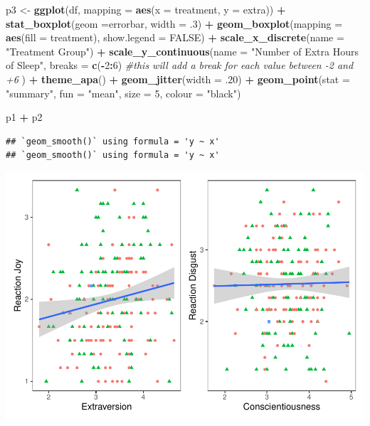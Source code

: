 \documentclass[
]{book}
\newenvironment{Shaded}{\begin{snugshade}}{\end{snugshade}}
\newcommand{\AttributeTok}[1]{\textcolor[rgb]{0.13,0.29,0.53}{#1}}
\newcommand{\CommentTok}[1]{\textcolor[rgb]{0.56,0.35,0.01}{\textit{#1}}}
\newcommand{\ConstantTok}[1]{\textcolor[rgb]{0.56,0.35,0.01}{#1}}
\newcommand{\DecValTok}[1]{\textcolor[rgb]{0.00,0.00,0.81}{#1}}
\newcommand{\FunctionTok}[1]{\textcolor[rgb]{0.13,0.29,0.53}{\textbf{#1}}}
\newcommand{\NormalTok}[1]{#1}
\newcommand{\OtherTok}[1]{\textcolor[rgb]{0.56,0.35,0.01}{#1}}
\newcommand{\SpecialCharTok}[1]{\textcolor[rgb]{0.81,0.36,0.00}{\textbf{#1}}}
\newcommand{\StringTok}[1]{\textcolor[rgb]{0.31,0.60,0.02}{#1}}
\begin{document}
\begin{Shaded}
\begin{Highlighting}[]
\NormalTok{p3 }\OtherTok{\textless{}{-}} \FunctionTok{ggplot}\NormalTok{(df, }\AttributeTok{mapping =} \FunctionTok{aes}\NormalTok{(}\AttributeTok{x =}\NormalTok{ treatment, }\AttributeTok{y =}\NormalTok{ extra)) }\SpecialCharTok{+} 
  \FunctionTok{stat\_boxplot}\NormalTok{(}\AttributeTok{geom =}\StringTok{\textquotesingle{}errorbar\textquotesingle{}}\NormalTok{, }\AttributeTok{width =}\NormalTok{ .}\DecValTok{3}\NormalTok{) }\SpecialCharTok{+}
  \FunctionTok{geom\_boxplot}\NormalTok{(}\AttributeTok{mapping =} \FunctionTok{aes}\NormalTok{(}\AttributeTok{fill =}\NormalTok{ treatment), }\AttributeTok{show.legend =} \ConstantTok{FALSE}\NormalTok{) }\SpecialCharTok{+} 
  \FunctionTok{scale\_x\_discrete}\NormalTok{(}\AttributeTok{name =} \StringTok{"Treatment Group"}\NormalTok{) }\SpecialCharTok{+} 
  \FunctionTok{scale\_y\_continuous}\NormalTok{(}\AttributeTok{name =} \StringTok{"Number of Extra Hours of Sleep"}\NormalTok{, }
                     \AttributeTok{breaks =} \FunctionTok{c}\NormalTok{(}\SpecialCharTok{{-}}\DecValTok{2}\SpecialCharTok{:}\DecValTok{6}\NormalTok{) }\CommentTok{\#this will add a break for each value between {-}2 and +6}
\NormalTok{                     ) }\SpecialCharTok{+}
  \FunctionTok{theme\_apa}\NormalTok{() }\SpecialCharTok{+}
  \FunctionTok{geom\_jitter}\NormalTok{(}\AttributeTok{width =}\NormalTok{ .}\DecValTok{20}\NormalTok{) }\SpecialCharTok{+}
  \FunctionTok{geom\_point}\NormalTok{(}\AttributeTok{stat =} \StringTok{"summary"}\NormalTok{, }\AttributeTok{fun =} \StringTok{"mean"}\NormalTok{, }\AttributeTok{size =} \DecValTok{5}\NormalTok{, }\AttributeTok{colour =} \StringTok{"black"}\NormalTok{)}


\NormalTok{p1 }\SpecialCharTok{+}\NormalTok{ p2}
\end{Highlighting}
\end{Shaded}

\begin{verbatim}
## `geom_smooth()` using formula = 'y ~ x'
## `geom_smooth()` using formula = 'y ~ x'
\end{verbatim}

\includegraphics{rintro_demo_files/figure-latex/unnamed-chunk-320-1.pdf}
\end{document}
